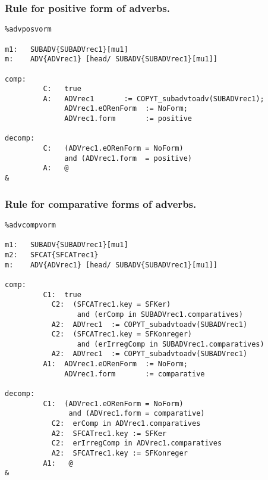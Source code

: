 \subsubsection{Rule for positive form of adverbs.}
\begin{verbatim}
%advposvorm

m1:   SUBADV{SUBADVrec1}[mu1]
m:    ADV{ADVrec1} [head/ SUBADV{SUBADVrec1}[mu1]]

comp:     
         C:   true
         A:   ADVrec1       := COPYT_subadvtoadv(SUBADVrec1);
              ADVrec1.eORenForm  := NoForm;
              ADVrec1.form       := positive

decomp:  
         C:   (ADVrec1.eORenForm = NoForm)
              and (ADVrec1.form  = positive)
         A:   @
&
\end{verbatim}
\newpage
\subsubsection{Rule for comparative forms of adverbs.}
\begin{verbatim} 
%advcompvorm

m1:   SUBADV{SUBADVrec1}[mu1]
m2:   SFCAT{SFCATrec1}
m:    ADV{ADVrec1} [head/ SUBADV{SUBADVrec1}[mu1]]

comp:    
         C1:  true
           C2:  (SFCATrec1.key = SFKer) 
                 and (erComp in SUBADVrec1.comparatives)
           A2:  ADVrec1  := COPYT_subadvtoadv(SUBADVrec1)
           C2:  (SFCATrec1.key = SFKonreger) 
                 and (erIrregComp in SUBADVrec1.comparatives) 
           A2:  ADVrec1  := COPYT_subadvtoadv(SUBADVrec1)
         A1:  ADVrec1.eORenForm  := NoForm;
              ADVrec1.form       := comparative

decomp:  
         C1:  (ADVrec1.eORenForm = NoForm) 
               and (ADVrec1.form = comparative)
           C2:  erComp in ADVrec1.comparatives
           A2:  SFCATrec1.key := SFKer
           C2:  erIrregComp in ADVrec1.comparatives
           A2:  SFCATrec1.key := SFKonreger
         A1:   @
&
\end{verbatim}
\newpage
